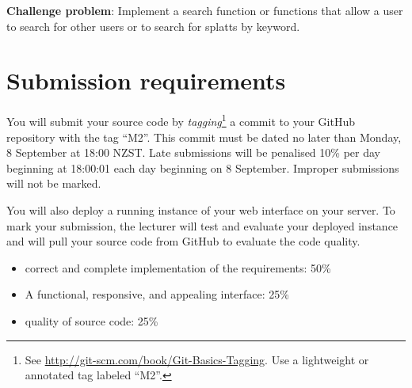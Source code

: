\documentclass{article}
\begin{document}
\textbf{Challenge problem}: Implement a search function or functions that allow a user to search for other users or to search for splatts by keyword.

\section{Submission requirements}
  You will submit your source code by \emph{tagging}\footnote{See \url{http://git-scm.com/book/Git-Basics-Tagging}.  Use a lightweight or annotated tag labeled ``M2''.} a commit to your GitHub repository with the tag ``M2''.  This commit must be dated no later than Monday, 8 September at 18:00 NZST. Late submissions will be penalised 10\% per day beginning at 18:00:01 each day beginning on 8 September.  Improper submissions will not be marked.  

  You will also deploy a running instance of your web interface on your server.  To mark your submission, the lecturer will test and evaluate your deployed instance and will pull your source code from GitHub to evaluate the code quality.

\begin{itemize}
  \item correct and complete implementation of the requirements:  50\%
  \item A functional, responsive, and appealing interface: 25\%
  \item quality of source code: 25\%
\end{itemize}
\end{document}
